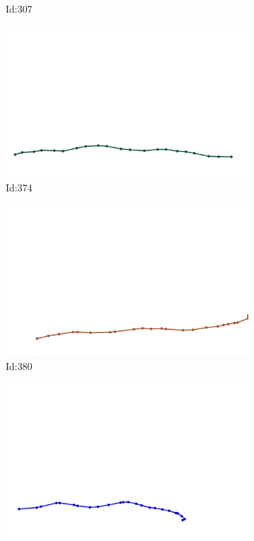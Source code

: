 \documentclass[12pt,twoside]{report}
\begin{document}
\begin{figure}
\begin{subfigure}[b]{0.20\textwidth}
\caption{Id:307}
\end{subfigure}
\begin{subfigure}[b]{0.20\textwidth}
\centering
\includegraphics[width=\textwidth]{../trajectories/374.png}
\caption{Id:374}
\end{subfigure}
\begin{subfigure}[b]{0.20\textwidth}
\centering
\includegraphics[width=\textwidth]{../trajectories/380.png}
\caption{Id:380}
\end{subfigure}
\begin{subfigure}[b]{0.20\textwidth}
\centering
\includegraphics[width=\textwidth]{../trajectories/389.png}

\end{subfigure}
\end{figure}
\end{document}
